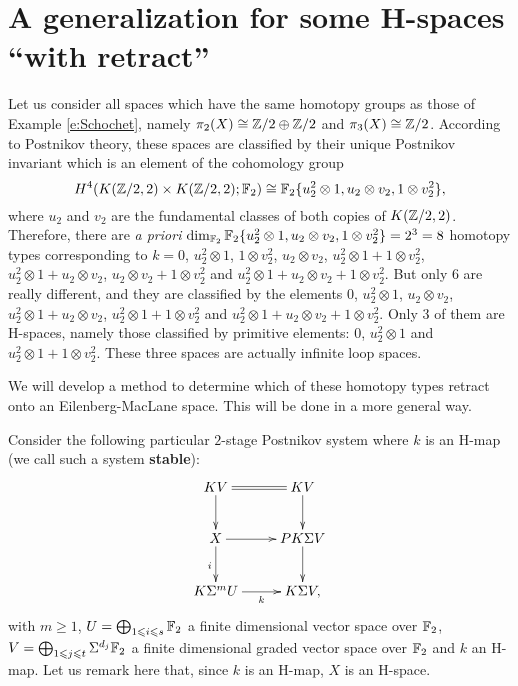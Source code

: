 \section{A generalization for some H-spaces ``with retract''}\label{s:slight generalization}

Let us consider all spaces which have the same homotopy groups as those of Example \ref{e:Schochet}, namely $\pi_2(X)\cong\mathbb{Z}/2\oplus\mathbb{Z}/2$ and $\pi_3(X)\cong\mathbb{Z}/2$. According to Postnikov theory, these spaces are classified by their unique Postnikov invariant which is an element of the cohomology group
$$
H^4(K(\mathbb{Z}/2,2)\times K(\mathbb{Z}/2,2);\mathbb{F}_2)\cong\mathbb{F}_2\{u_2^2\otimes1, u_2\otimes v_2,1\otimes v_2^2\},
$$ where $u_2$ and $v_2$ are the fundamental classes of both copies of $K(\mathbb{Z}/2,2)$. Therefore, there are {\it a priori} $\dim_{\mathbb{F}_2}\mathbb{F}_2\{u_2^2\otimes1, u_2\otimes v_2,1\otimes v_2^2\}=2^3=8$ homotopy types corresponding to $k=0$, $u_2^2\otimes1$, $1\otimes v_2^2$, $u_2\otimes v_2$, $u_2^2\otimes1+1\otimes v_2^2$, $u_2^2\otimes1+u_2\otimes v_2$, $u_2\otimes v_2+1\otimes v_2^2$ and $u_2^2\otimes1+u_2\otimes v_2+1\otimes v_2^2$. But only $6$ are really different, and they are classified by the elements $0$, $u_2^2\otimes1$, $u_2\otimes v_2$, $u_2^2\otimes1+u_2\otimes v_2$, $u_2^2\otimes 1+1\otimes v_2^2$ and $u_2^2\otimes1+u_2\otimes v_2+1\otimes v_2^2$. Only $3$ of them are H-spaces, namely those classified by primitive elements: $0$, $u_2^2\otimes1$ and $u_2^2\otimes1+1\otimes v_2^2$. These three spaces are actually infinite loop spaces.

We will develop a method to determine which of these homotopy types retract onto an Eilenberg-MacLane space. This will be done in a more general way.


\bigskip
Consider the following particular $2$-stage Postnikov system where $k$ is an H-map (we call such a system {\bf stable}):
$$\xymatrix{
KV\ar[d]\ar@{=}[r] &KV\ar[d]\\
X\ar[r]\ar[d]_i &PK\Sigma V\ar[d]\\
K\Sigma^mU\ar[r]_-k &K\Sigma V,
}$$ with $m\geq1$, $U=\bigoplus_{1\leqslant i\leqslant s}\mathbb{F}_2$ a finite dimensional vector space over $\mathbb{F}_2$, $V=\bigoplus_{1\leqslant j\leqslant t}\Sigma^{d_j}\mathbb{F}_2$ a finite dimensional graded vector space over $\mathbb{F}_2$ and $k$ an H-map. Let us remark here that, since $k$ is an H-map, $X$ is an H-space.

